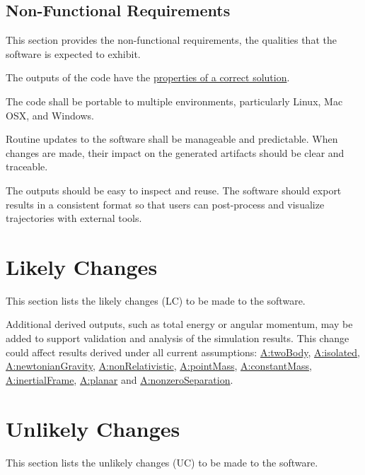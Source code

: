 \documentclass[12pt]{article}
\begin{document}
\subsection{Non-Functional Requirements}
\label{Sec:NFRs}
This section provides the non-functional requirements, the qualities that the software is expected to exhibit.

\begin{description}[font=\normalfont]
\item[Correctness:\phantomsection\label{correct}]{The outputs of the code have the \hyperref[Sec:CorSolProps]{properties of a correct solution}.}
\item[Portability:\phantomsection\label{portable}]{The code shall be portable to multiple environments, particularly Linux, Mac OSX, and Windows.}
\item[Maintainability:\phantomsection\label{maintainable}]{Routine updates to the software shall be manageable and predictable. When changes are made, their impact on the generated artifacts should be clear and traceable.}
\item[Usability:\phantomsection\label{usable}]{The outputs should be easy to inspect and reuse. The software should export results in a consistent format so that users can post-process and visualize trajectories with external tools.}
\end{description}
\section{Likely Changes}
\label{Sec:LCs}
This section lists the likely changes (LC) to be made to the software.

\begin{description}[font=\normalfont]
\item[Derived-Output-Quantities:\phantomsection\label{lcDerivedOutputs}]{Additional derived outputs, such as total energy or angular momentum, may be added to support validation and analysis of the simulation results. This change could affect results derived under all current assumptions: \hyperref[twoBody]{A:twoBody}, \hyperref[isolated]{A:isolated}, \hyperref[newtonianGravity]{A:newtonianGravity}, \hyperref[nonRelativistic]{A:nonRelativistic}, \hyperref[pointMass]{A:pointMass}, \hyperref[constantMass]{A:constantMass}, \hyperref[inertialFrame]{A:inertialFrame}, \hyperref[planar]{A:planar} and \hyperref[nonzeroSeparation]{A:nonzeroSeparation}.}
\end{description}
\section{Unlikely Changes}
\label{Sec:UCs}
This section lists the unlikely changes (UC) to be made to the software.
\end{document}
